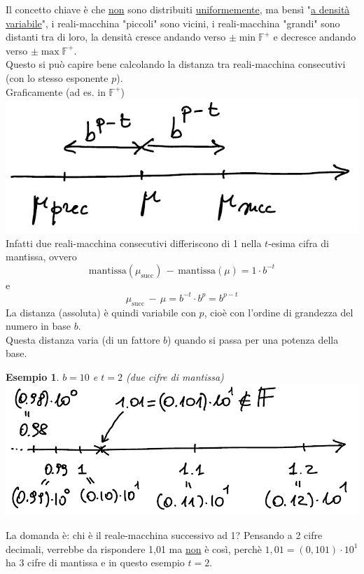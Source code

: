 \documentclass[12pt]{article}
\newtheorem*{esempio}{Esempio}
\begin{document}
Il concetto chiave è che \underline{non} sono distribuiti \underline{uniformemente}, ma bensì "\underline{a densità variabile}", i reali-macchina "piccoli" sono vicini, i reali-macchina "grandi" sono distanti tra di loro, la densità cresce andando verso $\pm \min \mathbb{F}^+$ e decresce andando verso $\pm \max \mathbb{F}^+$. \\
Questo si può capire bene calcolando la distanza tra reali-macchina consecutivi (con lo stesso esponente $p$).\\
Graficamente (ad es. in $\mathbb{F}^+$) \newline
\includegraphics[width=\linewidth]{img5}
Infatti due reali-macchina consecutivi differiscono di 1 nella $t$-esima cifra di mantissa, ovvero
\[ \text{mantissa}(\mu_{\text{succ}})\,-\,\text{mantissa}(\mu) = 1 \cdot b^{-t}\] e 
\[ \mu_{\text{succ}}\,-\,\mu = b^{-t} \cdot b^p = b^{p-t} \]
La distanza (assoluta) è quindi variabile con $p$, cioè con l'ordine di grandezza del numero in base $b$. \\
Questa distanza varia (di un fattore $b$) quando si passa per una potenza della base.
\begin{esempio}
$b = 10$ e $t = 2$ (due cifre di mantissa) \newline
\includegraphics[width=\linewidth]{img6}
\end{esempio}
La domanda è: chi è il reale-macchina successivo ad 1? Pensando a 2 cifre decimali, verrebbe da rispondere 1,01 ma \underline{non} è così, perchè $1,01 = (0,101)\cdot 10^1$ ha 3 cifre di mantissa e in questo esempio $t=2$.\\
\end{document}
